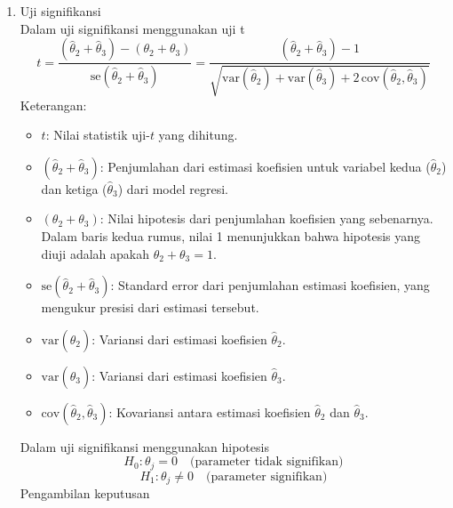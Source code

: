 \begin{enumerate}
\begin{enumerate}[label=\alph*)]
\begin{enumerate}[label=\roman*)]
            \item Uji signifikansi \\
            Dalam uji signifikansi menggunakan uji t
            \begin{equation}\label{st_ma_uji_signifkansi}
                t = \frac{(\hat{\theta}_2 + \hat{\theta}_3) - (\theta_2 + \theta_3)}{\text{se}(\hat{\theta}_2 + \hat{\theta}_3)}
                = \frac{(\hat{\theta}_2 + \hat{\theta}_3) - 1}{\sqrt{\text{var}(\hat{\theta}_2) + \text{var}(\hat{\theta}_3) + 2 \, \text{cov}(\hat{\theta}_2, \hat{\theta}_3)}}
            \end{equation}
            Keterangan:
            \begin{itemize}
                \item $t$: Nilai statistik uji-$t$ yang dihitung.
                \item $(\hat{\theta}_2 + \hat{\theta}_3)$: Penjumlahan dari estimasi koefisien untuk variabel kedua ($\hat{\theta}_2$) dan ketiga ($\hat{\theta}_3$) dari model regresi.
                \item $(\theta_2 + \theta_3)$: Nilai hipotesis dari penjumlahan koefisien yang sebenarnya. Dalam baris kedua rumus, nilai 1 menunjukkan bahwa hipotesis yang diuji adalah apakah $\theta_2 + \theta_3 = 1$.
                \item $\text{se}(\hat{\theta}_2 + \hat{\theta}_3)$: Standard error dari penjumlahan estimasi koefisien, yang mengukur presisi dari estimasi tersebut.
                \item $\text{var}(\hat{\theta}_2)$: Variansi dari estimasi koefisien $\hat{\theta}_2$.
                \item $\text{var}(\hat{\theta}_3)$: Variansi dari estimasi koefisien $\hat{\theta}_3$.
                \item $\text{cov}(\hat{\theta}_2, \hat{\theta}_3)$: Kovariansi antara estimasi koefisien $\hat{\theta}_2$ dan $\hat{\theta}_3$.
            \end{itemize}
            Dalam uji signifikansi menggunakan hipotesis
            \begin{equation}\label{st_ma_hipotesa0}
                H_0 : \theta_j = 0 \quad \text{(parameter tidak signifikan)}
            \end{equation}\label{st_ma_hipotesa1}
            \begin{equation}
                H_1 : \theta_j \neq 0 \quad \text{(parameter signifikan)}
            \end{equation}
            Pengambilan keputusan

\end{enumerate}
\end{enumerate}
\end{enumerate}

